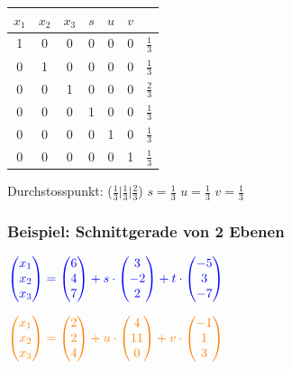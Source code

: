   		\begin{tabular}{| c c c c c c | c |}
		\hline
		$x_1$ & $x_2$ & $x_3$ & $s$ & $u$ & $v$ & \\
		\hline
		1 & 0 & 0 & 0 & 0 & 0 & $\frac{1}{3}$ \\
		0 & 1 & 0 & 0 & 0 & 0 & $\frac{1}{3}$ \\
		0 & 0 & 1 & 0 & 0 & 0 & $\frac{2}{3}$ \\
		0 & 0 & 0 & 1 & 0 & 0 & $\frac{1}{3}$ \\
		0 & 0 & 0 & 0 & 1 & 0 & $\frac{1}{3}$ \\
		0 & 0 & 0 & 0 & 0 & 1 & $\frac{1}{3}$\\
	    \hline
		\end{tabular}		
	
	\vspace{0.1cm}
	
		Durchstosspunkt: ($\frac{1}{3} \vert \frac{1}{3} \vert \frac{2}{3}$) \quad $s = \frac{1}{3}$ \quad $u = \frac{1}{3}$ \quad $v =  \frac{1}{3}$	
						
	
	
	
			\subsubsection{Beispiel: Schnittgerade von 2 Ebenen}		    					$\textcolor{blue}{\begin{pmatrix} x_1 \\ x_2 \\ x_3 \end{pmatrix} = \begin{pmatrix} 6 \\ 4 \\ 7 \end{pmatrix} + s \cdot \begin{pmatrix} 3 \\ -2 \\ 2\end{pmatrix} + t \cdot \begin{pmatrix} -5 \\ 3 \\ -7\end{pmatrix}}$ \\
			
			\vspace{0.1cm}
			
			 $\textcolor{orange}{\begin{pmatrix} x_1 \\ x_2 \\ x_3 \end{pmatrix} = \begin{pmatrix} 2 \\ 2 \\ 4 \end{pmatrix} + u \cdot \begin{pmatrix} 4 \\ 11 \\ 0\end{pmatrix} + v \cdot \begin{pmatrix} -1 \\ 1 \\ 3\end{pmatrix}}$ \\
		\\

